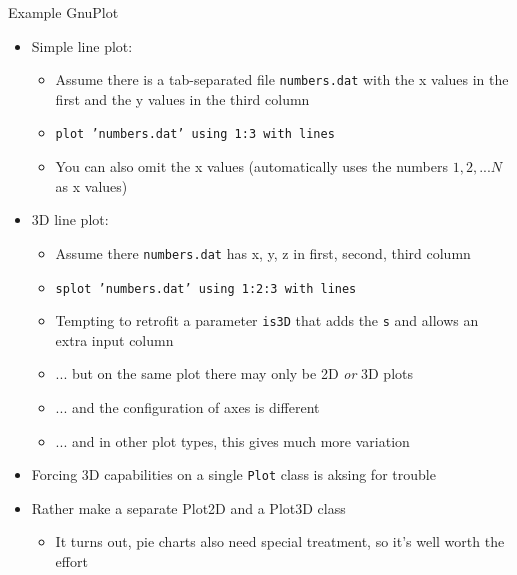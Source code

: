 \begin{frame}{Example GnuPlot}
%
\begin{itemize}
\item Simple line plot:\\
	\begin{itemize}
	\item Assume there is a tab-separated file \texttt{numbers.dat} with the x values in the first and the y values in the third column
	\item \texttt{plot 'numbers.dat' using 1:3 with lines}
	\item You can also omit the x values (automatically uses the numbers $1, 2, ... N$ as x values)
	\end{itemize}
	\pause
\item 3D line plot:\\
	\begin{itemize}
	\item Assume there \texttt{numbers.dat} has x, y, z in first, second, third column
	\item \texttt{{\color{blue}s}plot 'numbers.dat' using 1:2:3 with lines}
	\item[\Thus] Tempting to retrofit a parameter \texttt{is3D} that adds the \texttt{s} and allows an extra input column
		\pause
	\item ... but on the same plot there may only be 2D \emph{or} 3D plots
	\item ... and the configuration of axes is different
	\item ... and in other plot types, this gives much more variation
	\end{itemize}
	\pause
\item[\Thus] Forcing 3D capabilities on a single \texttt{Plot} class is aksing for trouble
	\pause
\item[\Thus] Rather make a separate Plot2D and a Plot3D class
	\begin{itemize}
	\item It turns out, pie charts also need special treatment, so it's well worth the effort
	\end{itemize}
\end{itemize}
%
\end{frame}


